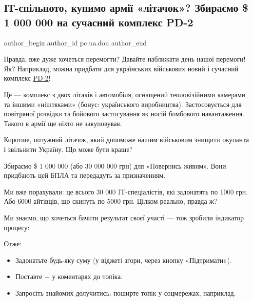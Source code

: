  
 
 
 
 
 
\subsection{ІТ-спільното, купимо армії «літачок»? Збираємо \$ 1 000 000 на сучасний комплекс PD-2}
\label{sec:06_05_2022.stz.pc.ua.dou.1.litachok}
 
\ifcmt
 author_begin
   author_id pc.ua.dou
 author_end
\fi

Правда, вже дуже хочеться перемогти? Давайте наближати день нашої перемоги! Як?
Наприклад, можна придбати для українських військових новий і сучасний комплекс
\href{https://uk.wikipedia.org/wiki/PD-2}{PD-2}!

Це — комплекс з двох літаків і автомобіля, оснащений тепловізійними камерами та
іншими «ніштяками» (бонус: українського виробництва). Застосовується для
повітряної розвідки та бойового застосування як носій бомбового навантаження.
Такого в армії ще ніхто не закуповував.

Коротше, потужний літачок, який допоможе нашим військовим знищити окупанта і
звільнити Україну. Що може бути краще?

Збираємо \$ 1 000 000 (або 30 000 000 грн) для «Повернись живим». Вони
придбають цей БПЛА та передадуть за призначенням.

Ми вже порахували: це всього 30 000 IT-спеціалістів, які задонатять по 1000
грн. Або 6000 айтівців, що скинуть по 5000 грн. Цілком реально, правда ж?

Ми знаємо, що хочеться бачити результат своєї участі — тож зробили індикатор
процесу:


Отже:

\begin{itemize}
  \item Задонатьте будь-яку суму (у віджеті згори, через кнопку «Підтримати»).
  \item Поставте + у коментарях до топіка.
  \item Запросіть знайомих долучитись: поширте топік у соцмережах, наприклад.
\end{itemize}

